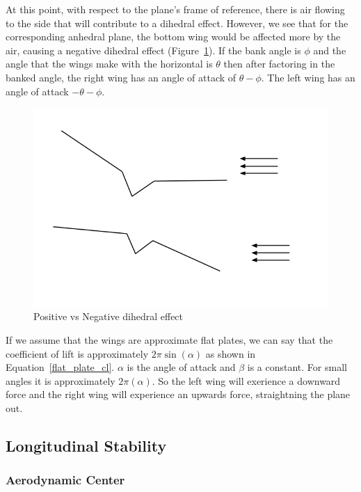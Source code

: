At this point, with respect to the plane's frame of reference, there is air flowing 
to the side that will contribute to a dihedral effect. However, we see that for the
corresponding anhedral plane, the bottom wing would be affected more by the air, causing
a negative dihedral effect (Figure~\ref{fig:dihedral2}). If the bank angle is $\phi$ and
the angle that the wings make with the horizontal is $\theta$ then after factoring in
the banked angle, the right wing has an angle of attack of  $\theta - \phi$.
The left wing has an angle of attack $- \theta - \phi$.


\begin{figure}[hl]
  \centering
    \includegraphics[scale=.5]{figures/dihedral2.png}
    \caption{Positive vs Negative dihedral effect}
  \label{fig:dihedral2}
\end{figure}

If we assume that the wings are approximate flat plates, we can say that the
coefficient of lift is approximately $2\pi\sin(\alpha)$ as shown in Equation~\ref{flat_plate_cl}. 
$\alpha$ is
the angle of attack and $\beta$ is a constant. For small angles it is 
approximately $2\pi(\alpha)$. So the left wing will exerience a downward force
and the right wing will experience an upwards force, straightning the plane out.

\subsection{Longitudinal Stability}

\subsubsection{Aerodynamic Center}

